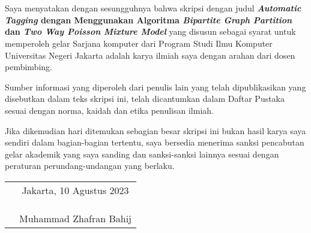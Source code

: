 \chapter*{}

Saya menyatakan dengan sesungguhnya bahwa skripsi dengan judul	\textbf{\textit{Automatic Tagging} dengan Menggunakan Algoritma \textit{Bipartite Graph Partition} dan \textit{Two Way Poisson Mixture Model}} yang disusun sebagai syarat untuk memperoleh gelar Sarjana komputer dari Program Studi Ilmu Komputer Universitas Negeri Jakarta adalah karya ilmiah saya dengan arahan dari dosen pembimbing.

Sumber informasi yang diperoleh dari penulis lain yang
telah dipublikasikan yang disebutkan dalam teks skripsi ini, telah dicantumkan dalam Daftar Pustaka sesuai dengan norma, kaidah dan etika penulisan ilmiah.

Jika dikemudian hari ditemukan sebagian besar skripsi ini bukan hasil karya saya sendiri dalam bagian-bagian tertentu, saya bersedia menerima sanksi pencabutan gelar akademik yang saya sanding dan sanksi-sanksi lainnya sesuai dengan peraturan perundang-undangan yang berlaku.

\vspace{.5cm}

\begin{tabular}{p{7.5cm}c}
	&Jakarta, 10 Agustus 2023\\
	&\\
	&\\
	&\\
	&Muhammad Zhafran Bahij
\end{tabular}